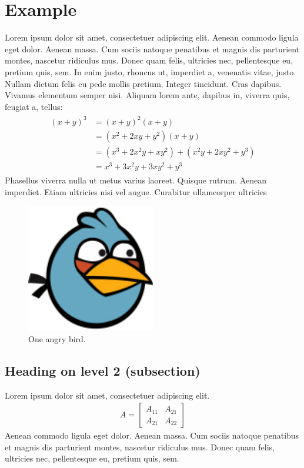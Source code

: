 \documentclass[11pt,english]{article}
\numberwithin{equation}{section}%
\numberwithin{figure}{section}%
\numberwithin{table}{section}%
\begin{document}
\section{Example}
Lorem ipsum dolor sit amet, consectetuer adipiscing elit. Aenean commodo ligula eget dolor. Aenean massa. Cum sociis natoque penatibus et magnis dis parturient montes, nascetur ridiculus mus. Donec quam felis, ultricies nec, pellentesque eu, pretium quis, sem. In enim justo, rhoncus ut, imperdiet a, venenatis vitae, justo. Nullam dictum felis eu pede mollis pretium. Integer tincidunt. Cras dapibus. Vivamus elementum semper nisi. Aliquam lorem ante, dapibus in, viverra quis, feugiat a, tellus:
\begin{align} 
	\begin{split}
	(x+y)^3 	&= (x+y)^2(x+y)\\
					&=(x^2+2xy+y^2)(x+y)\\
					&=(x^3+2x^2y+xy^2) + (x^2y+2xy^2+y^3)\\
					&=x^3+3x^2y+3xy^2+y^3
	\end{split}					
\end{align}
Phasellus viverra nulla ut metus varius laoreet. Quisque rutrum. Aenean imperdiet. Etiam ultricies nisi vel augue. Curabitur ullamcorper ultricies 

\begin{figure}[!ht]
  \caption{One angry bird.}
  \centering
    \includegraphics[width=0.5\textwidth]{image_example}
\end{figure}

\subsection{Heading on level 2 (subsection)}
Lorem ipsum dolor sit amet, consectetuer adipiscing elit. 
\begin{align}
	A = 
	\begin{bmatrix}
	A_{11} & A_{21} \\
  	A_{21} & A_{22}
	\end{bmatrix}
\end{align}
Aenean commodo ligula eget dolor. Aenean massa. Cum sociis natoque penatibus et magnis dis parturient montes, nascetur ridiculus mus. Donec quam felis, ultricies nec, pellentesque eu, pretium quis, sem.
\end{document}
